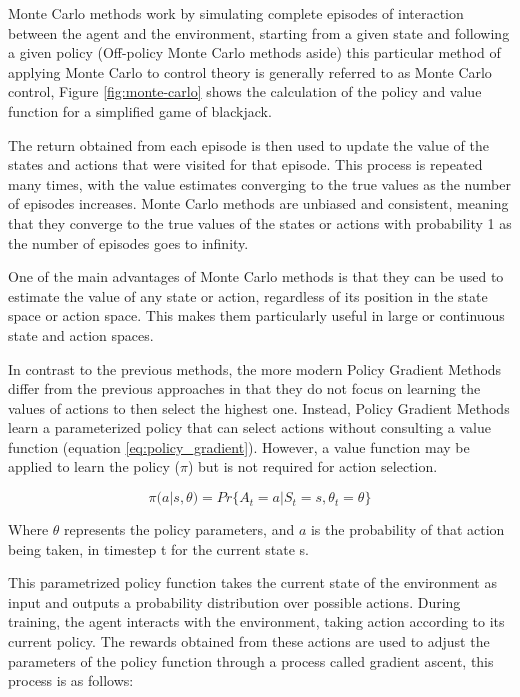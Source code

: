 Monte Carlo methods work by simulating complete episodes of interaction between the agent and the environment, starting from a given state and following a given policy (Off-policy Monte Carlo methods aside) this particular method of applying Monte Carlo to control theory is generally referred to as Monte Carlo control, Figure \ref{fig:monte-carlo} shows the calculation of the policy and value function for a simplified game of blackjack.

The return obtained from each episode is then used to update the value of the states and actions that were visited for that episode. This process is repeated many times, with the value estimates converging to the true values as the number of episodes increases. Monte Carlo methods are unbiased and consistent, meaning that they converge to the true values of the states or actions with probability 1 as the number of episodes goes to infinity.

One of the main advantages of Monte Carlo methods is that they can be used to estimate the value of any state or action, regardless of its position in the state space or action space. This makes them particularly useful in large or continuous state and action spaces.

In contrast to the previous methods, the more modern Policy Gradient Methods differ from the previous approaches in that they do not focus on learning the values of actions to then select the highest one. Instead, Policy Gradient Methods learn a parameterized policy that can select actions without consulting a value function (equation \ref{eq:policy_gradient}). However, a value function may be applied to learn the policy ($\pi$) but is not required for action selection.

\begin{equation}
    \label{eq:policy_gradient}
    \pi(a|s,\theta) = Pr\{A_t=a | S_t=s, \theta_t=\theta\}
\end{equation}

Where $\theta$ represents the policy parameters, and $a$ is the probability of that action being taken, in timestep t for the current state s.

This parametrized policy function takes the current state of the environment as input and outputs a probability distribution over possible actions. During training, the agent interacts with the environment, taking action according to its current policy. The rewards obtained from these actions are used to adjust the parameters of the policy function through a process called gradient ascent, this process is as follows:

